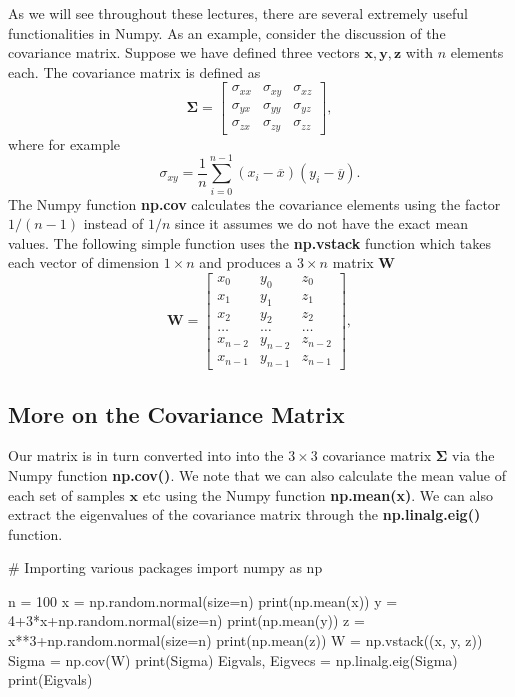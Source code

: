 \documentclass[%
oneside,                 %
final,                   %
10pt]{article}
\begin{document}
As we will see throughout these lectures, there are several extremely useful functionalities in Numpy.
As an example, consider the discussion of the covariance matrix. Suppose we have defined three vectors
$\bm{x}, \bm{y}, \bm{z}$ with $n$ elements each. The covariance matrix is defined as 
\[
\bm{\Sigma} = \begin{bmatrix} \sigma_{xx} & \sigma_{xy} & \sigma_{xz} \\
                              \sigma_{yx} & \sigma_{yy} & \sigma_{yz} \\
                              \sigma_{zx} & \sigma_{zy} & \sigma_{zz} 
             \end{bmatrix},
\]
where for example
\[
\sigma_{xy} =\frac{1}{n} \sum_{i=0}^{n-1}(x_i- \overline{x})(y_i- \overline{y}).
\]
The Numpy function \textbf{np.cov} calculates the covariance elements using the factor $1/(n-1)$ instead of $1/n$ since it assumes we do not have the exact mean values. 
The following simple function uses the \textbf{np.vstack} function which takes each vector of dimension $1\times n$ and produces a $3\times n$ matrix $\bm{W}$
\[
\bm{W} = \begin{bmatrix} x_0 & y_0 & z_0 \\
                          x_1 & y_1 & z_1 \\
                          x_2 & y_2 & z_2 \\
                          \dots & \dots & \dots \\
                          x_{n-2} & y_{n-2} & z_{n-2} \\
                          x_{n-1} & y_{n-1} & z_{n-1}
             \end{bmatrix},
\]


\subsection{More on the Covariance Matrix}

Our matrix is in turn converted into into the $3\times 3$ covariance matrix
$\bm{\Sigma}$ via the Numpy function \textbf{np.cov()}. We note that we can also calculate
the mean value of each set of samples $\bm{x}$ etc using the Numpy
function \textbf{np.mean(x)}. We can also extract the eigenvalues of the
covariance matrix through the \textbf{np.linalg.eig()} function.

\bpycod
# Importing various packages
import numpy as np

n = 100
x = np.random.normal(size=n)
print(np.mean(x))
y = 4+3*x+np.random.normal(size=n)
print(np.mean(y))
z = x**3+np.random.normal(size=n)
print(np.mean(z))
W = np.vstack((x, y, z))
Sigma = np.cov(W)
print(Sigma)
Eigvals, Eigvecs = np.linalg.eig(Sigma)
print(Eigvals)
\epycod
\end{document}

